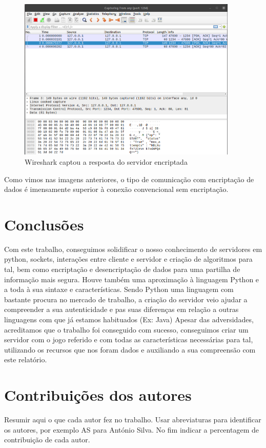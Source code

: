\documentclass{report}
\begin{document}
\begin{figure}[!h]
\center 
\includegraphics[height=220pt]{img/encripted/wireshark_start_response.png}
\caption{Wireshark captou a resposta do servidor encriptada}
\label{fig:wireshark_start_response_enc}
\end{figure}

Como vimos nas imagens anteriores, o tipo de comunicação com encriptação de dados é imensamente superior à conexão convencional sem encriptação.


\chapter{Conclusões}
\label{chap.conclusao}
Com este trabalho, conseguimos solidificar o nosso conhecimento de servidores em python, sockets, interações entre 
cliente e servidor e criação de algoritmos para tal, bem como encriptação e desencriptação de dados para uma partilha
de informação mais segura. Houve também uma aproximação à linguagem Python e a toda à sua sintaxe e características.
Sendo Python uma linguagem com bastante procura no mercado de trabalho, a criação do servidor veio ajudar a compreender
a sua autenticidade e pas suas diferenças em relação a outras linguagens com que já estamos habituados (Ex: Java)
Apesar das adversidades, acreditamos que o trabalho foi conseguido com sucesso, conseguimos criar um servidor 
com o jogo referido e com todas as características necessárias para tal, utilizando os recursos que nos foram dados
e auxiliando a sua compreensão com este relatório.

\chapter*{Contribuições dos autores}
Resumir aqui o que cada autor fez no trabalho.
Usar abreviaturas para identificar os autores,
por exemplo AS para António Silva.
No fim indicar a percentagem de contribuição de cada autor.
\end{document}
